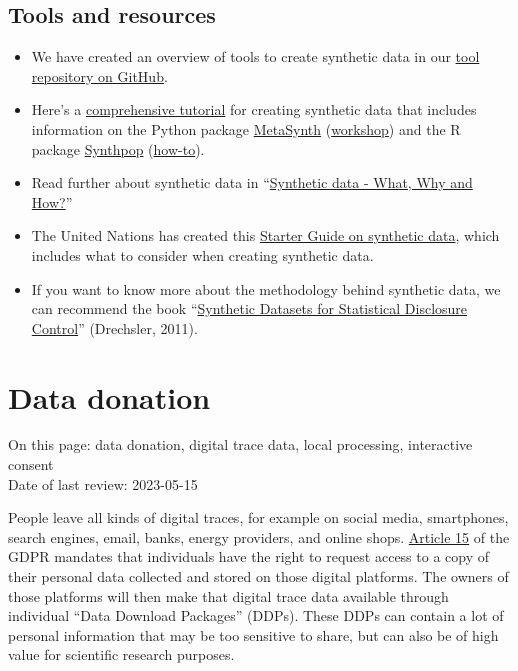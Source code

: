 \documentclass[
]{book}
\providecommand{\tightlist}{%
  \setlength{\itemsep}{0pt}\setlength{\parskip}{0pt}}
\begin{document}
\hypertarget{synthetic-data-resources}{%
\subsection{Tools and resources}\label{synthetic-data-resources}}

\begin{itemize}
\tightlist
\item
  We have created an overview of tools to create synthetic data in our
  \href{https://github.com/UtrechtUniversity/privacy-engineering-tools/tree/main/synthetic-data}{tool repository on GitHub}.
\item
  Here's a \href{https://doi.org/10.5281/zenodo.7234120}{comprehensive tutorial}
  for creating synthetic data that includes information on the Python package
  \href{https://github.com/sodascience/metasynth}{MetaSynth} (\href{https://github.com/sodascience/workshop-syntheticdata-osf2022}{workshop})
  and the R package \href{https://www.synthpop.org.uk/index.html}{Synthpop}
  (\href{https://thomvolker.github.io/osf_synthetic/osf_synthetic_workshop.html}{how-to}).
\item
  Read further about synthetic data in
  ``\href{https://doi.org/10.48550/arXiv.2205.03257}{Synthetic data - What, Why and How?}''
\item
  The United Nations has created this
  \href{https://unece.org/sites/default/files/2022-11/ECECESSTAT20226.pdf}{Starter Guide on synthetic data},
  which includes what to consider when creating synthetic data.
\item
  If you want to know more about the methodology behind synthetic data, we can
  recommend the book
  ``\href{https://doi.org/10.1007/978-1-4614-0326-5}{Synthetic Datasets for Statistical Disclosure Control}''
  (Drechsler, 2011).
\end{itemize}

\hypertarget{data-donation}{%
\section{Data donation}\label{data-donation}}

On this page: data donation, digital trace data, local processing, interactive
consent\\
Date of last review: 2023-05-15

People leave all kinds of digital traces, for example on social media,
smartphones, search engines, email, banks, energy providers, and online shops.
\href{https://gdpr-info.eu/art-15-gdpr/}{Article 15} of the GDPR
mandates that individuals have the right to request access to a copy of their
personal data collected and stored on those digital platforms. The owners of
those platforms will then make that digital trace data available through
individual ``Data Download Packages'' (DDPs). These DDPs can contain a lot of
personal information that may be too sensitive to share, but can also be of
high value for scientific research purposes.
\end{document}

